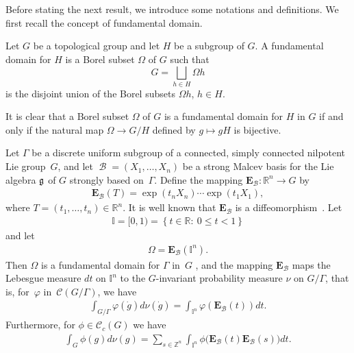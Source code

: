 \documentclass[11pt]{article}
\providecommand{\mathds}[1]{\mathbb{#1}}
\newcommand{\set}[1]{\left\{#1\right\}}
\DeclareMathOperator{\bbase}{\mathscr{B}}
\def\dsz{{\mathds Z}}
\def\tore{{\mathbb I}}
\begin{document}
 Before stating the next result, we introduce some notations and
def\/initions. We f\/irst recall the concept of fundamental domain.

\begin{definition} Let $G$ be a topological group and let $H$ be a
subgroup of $G$. A fundamental domain for $H$ is a Borel subset
$\Omega$ of $G$ such that
\[
G= \bigsqcup_{h\in H} \Omega h
\] is
the disjoint union of the Borel subsets $ \Omega h$, $h\in H $.
\end{definition}


\begin{remark}
It is clear that a Borel subset  $\Omega$ of $G$ is a
fundamental domain for $H$ in $G$ if and only if  the natural map
$\Omega \rightarrow G/H$ def\/ined by $g\mapsto gH$ is
bijective.
\end{remark}

Let $\Gamma$ be a discrete uniform subgroup of a connected, simply
connected nilpotent Lie group~$G$, and let $ \bbase =(X_1, \ldots,
X_n)$ be a strong Malcev basis for the Lie algebra $\frak g$ of $G$
strongly based on~$\Gamma$. Def\/ine the mapping $\mathbf{E}_{\bbase}:
\mathds{R}^n\rightarrow G$ by
\begin{gather*}
\mathbf{E}_{\bbase}(T) = \exp(t_n X_n)\cdots \exp(t_1 X_1),
\end{gather*}
where $T= (t_1, \ldots, t_n)\in \mathds{R}^n$. It is well known that
 $\mathbf{E}_{\bbase}$ is a dif\/feomorphism~\cite{Cor1}. Let
\begin{gather*}%
\tore = [0, 1) = \set{t\in \mathds{R}:\ 0\leq t < 1}
\end{gather*}
and let
\begin{gather*}%
\Omega= \mathbf{E}_{\bbase}(\tore^n).
\end{gather*}
Then $\Omega$ is a fundamental domain for $\Gamma$  in~$G$
\cite[Lemma~3.6]{Cor9}, and the mapping $\mathbf{E}_{\bbase}$ maps
the Lebesgue measure $dt$ on $\tore^n$ to the $G$-invariant
probability measure $\nu$ on $G/\Gamma$, that is, for~$\varphi $ in~$ \mathcal{C}(G/\Gamma)$, we have
\begin{gather*}%
\int_{G/\Gamma} \varphi( \dot{g}) d\nu( \dot{g}) = \int_{\tore^n}
\varphi( \mathbf{E}_{\bbase}(t)) dt.
\end{gather*}
Furthermore, for $\phi\in \mathcal{C}_c(G)$ we have
\begin{gather}\label{measure-fundamental-domain1}
\int_{G} \phi(g) d\nu(g) =  \sum_{s\in \dsz^n}\int_{\tore^n}
\phi\big( \mathbf{E}_{\bbase}(t) \mathbf{E}_{\bbase}(s)\big) dt.
\end{gather}
\end{document}
